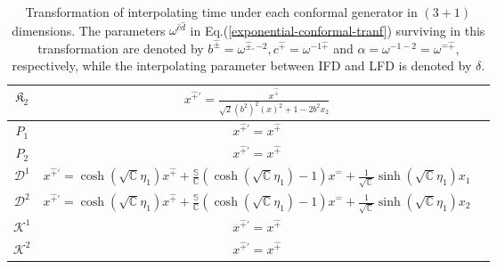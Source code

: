 \documentclass[journal,article,submit,pdftex,moreauthors]{Definitions/mdpi}
\begin{document}
\begin{table}[h!]
{\begin{tabular}{|c||c|c|}
             \hline
             \rule{0pt}{16pt} $\mathfrak{K}_{2}$ &  $x^{\hat{+}\prime}=\frac{x^{{\hat{+}}}}{ \sqrt{2}(b^{2})^{2}(x)^2+1-2b^{2}x_{2}}$ \\
             \hline
              \rule{0pt}{16pt} $P_{1}$ & $ x^{\hat{+}\prime}=x^{\hat{+}}$  \\
              \hline
              \rule{0pt}{16pt} $P_{2}$ & $ x^{\hat{+}\prime}=x^{\hat{+}}$  \\
              \hline
               \rule{0pt}{16pt} $\mathcal{D}^{1}$ &  $ x^{\hat{+}\prime}=\cosh{(\sqrt{\mathbb{C}}\eta_{1})}x^{\hat{+}}+\frac{\mathbb{S}}{\mathbb{C}}\left(\cosh{(\sqrt{\mathbb{C}}\eta_{1})}-1\right)x^{\hat{-}}+\frac{1}{\sqrt{\mathbb{C}}}\sinh{(\sqrt{\mathbb{C}}\eta_{1})}x_{{1}}$ \\
               \hline
               \rule{0pt}{16pt} $\mathcal{D}^{2}$ & $ x^{\hat{+}\prime}=\cosh{(\sqrt{\mathbb{C}}\eta_{1})}x^{\hat{+}}+\frac{\mathbb{S}}{\mathbb{C}}\left(\cosh{(\sqrt{\mathbb{C}}\eta_{1})}-1\right)x^{\hat{-}}+\frac{1}{\sqrt{\mathbb{C}}}\sinh{(\sqrt{\mathbb{C}}\eta_{1})}x_{{2}}$ \\
               \hline
               \rule{0pt}{16pt} $\mathcal{K}^{1}$ & $ x^{\hat{+}\prime}=x^{\hat{+}}$ \\
               \hline
               \rule{0pt}{16pt} $\mathcal{K}^{2}$ & $ x^{\hat{+}\prime}=x^{\hat{+}}$ \\
               \hline
        \end{tabular}}
        \caption{Transformation of interpolating time under each conformal generator in $(3+1)$ dimensions. The parameters $\omega^{\hat{c}\hat{d}}$ in Eq.(\ref{exponential-conformal-tranf}) surviving in this transformation are denoted by  
$b^{\hat{\pm}}=\omega^{\hat{\pm},-2},c^{\hat{+}}=\omega^{-1\hat{+}}$ and $\alpha=\omega^{-1-2}=\omega^{\hat{-}\hat{+}}$, respectively, while the interpolating parameter between IFD and LFD is denoted by $\delta$.}
        \label{tablexprime}
    \end{table}
\end{document}
